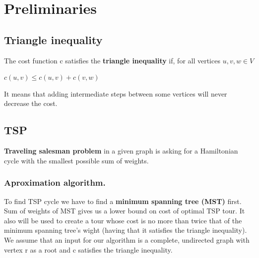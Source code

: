 \documentclass[runningheads, a4paper]{llncs}
\begin{document}
\section{Preliminaries}

\subsection{Triangle inequality}

The cost function c satisfies the \textbf{triangle inequality} if, for all vertices $u,v,w \in V$

\begin{center}
    $c(u,v)\leq c(u,v) + c(v,w)$
\end{center}

It means that adding intermediate steps between some vertices will never decrease the cost.

\subsection{TSP}

\textbf{Traveling salesman problem} in a given graph is asking for a Hamiltonian cycle with the smallest possible sum of weights.

\subsubsection{Aproximation algorithm.}
To find TSP cycle we have to find a \textbf{minimum spanning tree (MST)} first. Sum of weights of MST gives us a lower bound on cost of optimal TSP tour. It also will be used to create a tour whose cost is no more than twice that of the minimum spanning tree's wight (having that it satisfies the triangle inequality). We assume that an input for our algorithm is a complete, undirected graph with vertex r as a root and c satisfies the triangle inequality.
        
\end{document}
